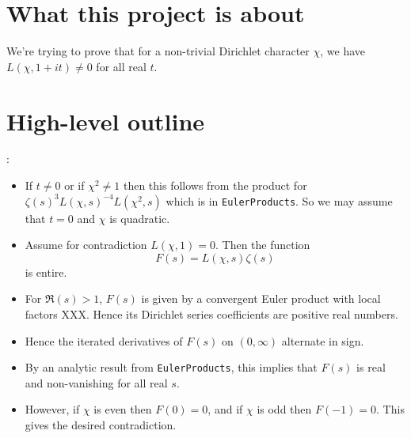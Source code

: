 %


\section{What this project is about}

We're trying to prove that for a non-trivial Dirichlet character $\chi$, we have $L(\chi, 1 + it) \ne 0$ for all real $t$.

\section{High-level outline}:

\begin{itemize}

\item If $t \ne 0$ or if $\chi^2 \ne 1$ then this follows from the product for $\zeta(s)^3 L(\chi, s)^{-4} L(\chi^2, s)$ which is in \texttt{EulerProducts}. So we may assume that $t = 0$ and $\chi$ is quadratic.

\item Assume for contradiction $L(\chi, 1) = 0$. Then the function
\[ F(s) = L(\chi, s) \zeta(s) \]
is entire.

\item For $\Re(s) > 1$, $F(s)$ is given by a convergent Euler product with local factors XXX. Hence its Dirichlet series coefficients are positive real numbers.

\item Hence the iterated derivatives of $F(s)$ on $(0, \infty)$ alternate in sign.

\item By an analytic result from \texttt{EulerProducts}, this implies that $F(s)$ is real and non-vanishing for all real $s$.


\item However, if $\chi$ is even then $F(0) = 0$, and if $\chi$ is odd then $F(-1) = 0$. This gives the desired contradiction.
\end{itemize}

